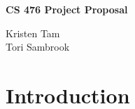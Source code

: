 \documentclass{article}
\begin{document}
\begin{titlepage}

    \centering
    \vspace*{3cm}
    \huge\bfseries
    CS 476 Project Proposal
    \vspace{1cm}
   
    \large Kristen Tam \\ 
    \vspace{0.1cm}
    \large Tori Sambrook
    \vfill

\end{titlepage}

\newpage
\section{Introduction}
\end{document}
